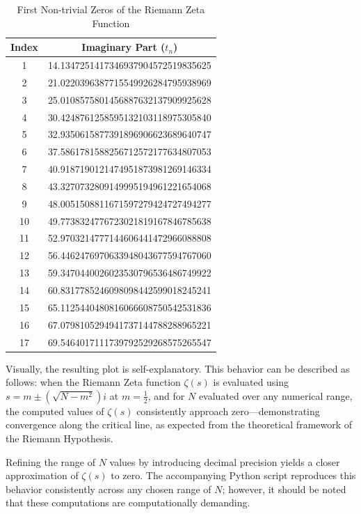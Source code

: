 \documentclass[11pt,a4paper]{article}
\begin{document}
\begin{table}[!htbp]
\centering
\caption{First Non-trivial Zeros of the Riemann Zeta Function}
\begin{tabular}{|c|c|}
\hline
\textbf{Index} & \textbf{Imaginary Part (\( t_n \))} \\
\hline
1  & 14.1347251417346937904572519835625 \\
2  & 21.0220396387715549926284795938969 \\
3  & 25.0108575801456887632137909925628 \\
4  & 30.4248761258595132103118975305840 \\
5  & 32.9350615877391896906623689640747 \\
6  & 37.5861781588256712572177634807053 \\
7  & 40.9187190121474951873981269146334 \\
8  & 43.3270732809149995194961221654068 \\
9  & 48.0051508811671597279424727494277 \\
10 & 49.7738324776723021819167846785638 \\
11 & 52.9703214777144606441472966088808 \\
12 & 56.4462476970633948043677594767060 \\
13 & 59.3470440026023530796536486749922 \\
14 & 60.8317785246098098442599018245241 \\
15 & 65.1125440480816066608750542531836 \\
16 & 67.0798105294941737144788288965221 \\
17 & 69.5464017111739792529268575265547 \\
\hline
\end{tabular}
\label{tab:riemann-zeros}
\end{table}

\medskip
\noindent
Visually, the resulting plot is self-explanatory. This behavior can be described as follows: 
when the Riemann Zeta function \( \zeta(s) \) is evaluated using $s = m \pm (\sqrt{N - m^2}) i$ at \( m = \tfrac{1}{2} \), 
and for \( N \) evaluated over any numerical range, the computed values of \( \zeta(s) \) 
consistently approach zero—demonstrating convergence along the critical line, as expected 
from the theoretical framework of the Riemann Hypothesis.

Refining the range of \( N \) values by introducing decimal precision yields a closer approximation of \( \zeta(s) \) to zero. 
The accompanying Python script reproduces this behavior consistently across any chosen range of \( N \); however, it should be noted 
that these computations are computationally demanding.
\end{document}
